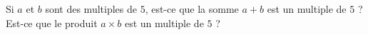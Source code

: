 
\begin{exercice}\label{exosmath-0852}

    Si \( a\) et \( b\) sont des multiples de \( 5\), est-ce que la somme \( a+b\) est un multiple de \( 5\) ? Est-ce que le produit \( a\times b\) est un multiple de \( 5\) ?

\end{exercice}
